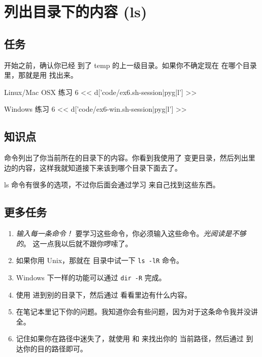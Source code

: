 \chapter{列出目录下的内容 (ls)}

\section{任务}

开始之前，确认你已经  到了 temp 的上一级目录。如果你不确定现在
在哪个目录里，那就是用  找出来。

\begin{code}{Linux/Mac OSX 练习 6}
<< d['code/ex6.sh-session|pyg|l'] >>
\end{code}

\begin{code}{Windows 练习 6}
<< d['code/ex6-win.sh-session|pyg|l'] >>
\end{code}

\section{知识点}

 命令列出了你当前所在的目录下的内容。你看到我使用了 
变更目录，然后列出里边的内容，这样我就知道接下来该到哪个目录下面去了。

ls 命令有很多的选项，不过你后面会通过学习  来自己找到这些东西。

\section{更多任务}

\begin{enumerate}
\item \emph{输入每一条命令！} 要学习这些命令，你必须输入这些命令。\emph{光阅读是不够的}。
    这一点我以后就不跟你啰嗦了。
\item 如果你用 Unix，那就在  目录中试一下 \verb|ls -lR| 命令。
\item Windows 下一样的功能可以通过 \verb|dir -R| 完成。
\item 使用  进到别的目录下，然后通过  看看里边有什么内容。
\item 在笔记本里记下你的问题。我知道你会有些问题，因为对于这条命令我并没讲全。
\item 记住如果你在路径中迷失了，就使用  和  来找出你的
    当前路径，然后通过  到达你的目的路径即可。
\end{enumerate}

